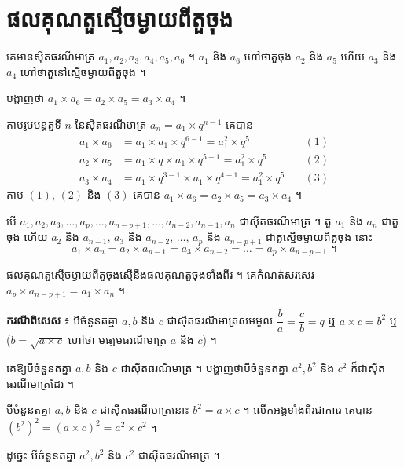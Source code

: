 \section{ផលគុណតួស្មើចម្ងាយពីតួចុង}

\begin{example}[ឧទាហរណ៍]
គេមានស៊ីតធរណីមាត្រ $a_1, a_2, a_3, a_4, a_5, a_6$ ។ $a_1$ និង $a_6$ ហៅថាតួចុង $a_2$ និង $a_5$ ហើយ $a_3$ និង $a_4$ ហៅថាតួនៅស្មើចម្ងាយពីតួចុង ។

បង្ហាញថា $a_1 \times a_6 = a_2 \times a_5 = a_3 \times a_4$ ។

តាមរូបមន្តតួទី $n$ នៃស៊ីតធរណីមាត្រ $a_n = a_1 \times q^{n-1}$ គេបាន
\[
\begin{aligned}
a_1 \times a_6 &= a_1 \times a_1 \times q^{6-1} = a_1^2 \times q^5 &\quad (1)\\
a_2 \times a_5 &= a_1 \times q \times a_1 \times q^{5-1} = a_1^2 \times q^5 &\quad (2)\\
a_3 \times a_4 &= a_1 \times q^{3-1} \times a_1 \times q^{4-1} = a_1^2 \times q^5 &\quad (3)
\end{aligned}
\]
តាម $(1)$, $(2)$ និង $(3)$ គេបាន $a_1 \times a_6 = a_2 \times a_5 = a_3 \times a_4$ ។
\end{example}

បើ $a_1, a_2, a_3, \ldots, a_p, \ldots, a_{n-p+1}, \ldots, a_{n-2}, a_{n-1}, a_n$ ជាស៊ីតធរណីមាត្រ ។ តួ $a_1$ និង $a_n$ ជាតួចុង ហើយ $a_2$ និង $a_{n-1}$, $a_3$ និង $a_{n-2}$, $\ldots$, $a_p$ និង $a_{n-p+1}$ ជាតួស្មើចម្ងាយពីតួចុង នោះ
\[
a_1 \times a_n = a_2 \times a_{n-1} = a_3 \times a_{n-2} = \ldots = a_p \times a_{n-p+1} \text{ ។}
\]

\begin{formulaBox}[ជាទូទៅ]
ផលគុណតួស្មើចម្ងាយពីតួចុងស្មើនឹងផលគុណតួចុងទាំងពីរ ។ គេកំណត់សរសេរ $a_p \times a_{n-p+1} = a_1 \times a_n$ ។

\textbf{ករណីពិសេស} ៖ បីចំនួនតគ្នា $a, b$ និង $c$ ជាស៊ីតធរណីមាត្រសមមូល $\dfrac{b}{a} = \dfrac{c}{b} = q$ ឬ $a \times c = b^2$ ឬ ($b = \sqrt{a \times c}$ ហៅថា មធ្យមធរណីមាត្រ $a$ និង $c$) ។
\end{formulaBox}

\begin{example}[លំហាត់គំរូ]
គេឱ្យបីចំនួនតគ្នា $a, b$ និង $c$ ជាស៊ីតធរណីមាត្រ ។ បង្ហាញថាបីចំនួនតគ្នា $a^2, b^2$ និង $c^2$ ក៏ជាស៊ីតធរណីមាត្រដែរ ។
\end{example}
\ans
បីចំនួនតគ្នា $a, b$ និង $c$ ជាស៊ីតធរណីមាត្រនោះ $b^2 = a \times c$ ។ លើកអង្គទាំងពីរជាការេ គេបាន $(b^2)^2 = (a \times c)^2 = a^2 \times c^2$ ។

ដូច្នេះ បីចំនួនតគ្នា $a^2, b^2$ និង $c^2$ ជាស៊ីតធរណីមាត្រ ។

